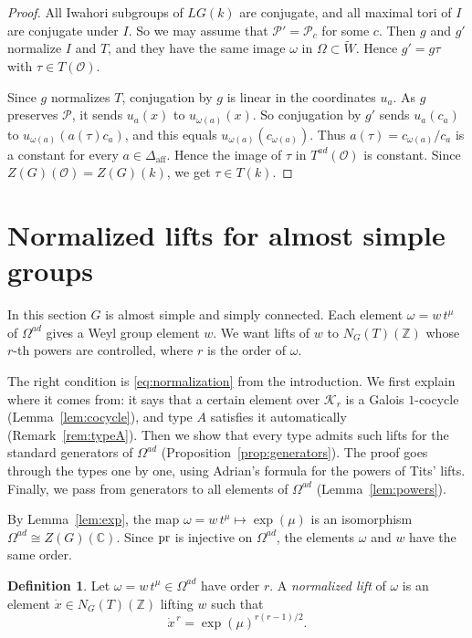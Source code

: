 \documentclass[psamsfonts]{amsart}
\theoremstyle{definition}
\newtheorem{defn}[thm]{Definition}
\theoremstyle{remark}
\numberwithin{equation}{section}
\newcommand{\Z}{\mathbb{Z}}   %
\newcommand{\extw}{\widetilde{W}}
\DeclareMathOperator{\aff}{aff}
\newcommand\cK{\mathcal{K}}
\newcommand\cO{\mathcal{O}}
\newcommand\cP{\mathcal{P}}
\newcommand{\CC}{\mathbb{C}}
\numberwithin{equation}{section}
\newcommand{\om}{\omega}
\newcommand{\Om}{\Omega}
\newcommand\pr{\textup{pr}}
\newcommand{\Daff}{\Delta_{\aff}}
\theoremstyle{plain}
\begin{document}
\begin{proof}
All Iwahori subgroups of $LG(k)$ are conjugate, and all maximal tori of $I$ are conjugate under $I$. So we may assume that $\cP'=\cP_c$ for some $c$. Then $g$ and $g'$ normalize $I$ and $T$, and they have the same image $\om$ in $\Om\subset\extw$. Hence $g'=g\tau$ with $\tau\in T(\cO)$.

Since $g$ normalizes $T$, conjugation by $g$ is linear in the coordinates $u_a$. As $g$ preserves $\cP$, it sends $u_a(x)$ to $u_{\om(a)}(x)$. So conjugation by $g'$ sends $u_a(c_a)$ to $u_{\om(a)}(a(\tau)c_a)$, and this equals $u_{\om(a)}(c_{\om(a)})$. Thus $a(\tau)=c_{\om(a)}/c_a$ is a constant for every $a\in\Daff$. Hence the image of $\tau$ in $T^{ad}(\cO)$ is constant. Since $Z(G)(\cO)=Z(G)(k)$, we get $\tau\in T(k)$.
\end{proof}


\section{Normalized lifts for almost simple groups}\label{sec:normalized}

In this section $G$ is almost simple and simply connected. Each element $\om=w\,t^\mu$ of $\Om^{ad}$ gives a Weyl group element $w$. We want lifts of $w$ to $N_G(T)(\Z)$ whose $r$-th powers are controlled, where $r$ is the order of $\om$.

The right condition is \eqref{eq:normalization} from the introduction. We first explain where it comes from: it says that a certain element over $\cK_r$ is a Galois $1$-cocycle (Lemma~\ref{lem:cocycle}), and type $A$ satisfies it automatically (Remark~\ref{rem:typeA}). Then we show that every type admits such lifts for the standard generators of $\Om^{ad}$ (Proposition~\ref{prop:generators}). The proof goes through the types one by one, using Adrian's formula for the powers of Tits' lifts. Finally, we pass from generators to all elements of $\Om^{ad}$ (Lemma~\ref{lem:powers}).

By Lemma~\ref{lem:exp}, the map $\om=w\,t^{\mu}\mapsto\exp(\mu)$ is an isomorphism $\Om^{ad}\cong Z(G)(\CC)$. Since $\pr$ is injective on $\Om^{ad}$, the elements $\om$ and $w$ have the same order.

\begin{defn}\label{defn:normalized}
Let $\om=w\,t^{\mu}\in\Om^{ad}$ have order $r$. A \emph{normalized lift} of $\om$ is an element $\dot x\in N_G(T)(\Z)$ lifting $w$ such that
\[
\dot x^{\,r}=\exp(\mu)^{r(r-1)/2}.
\]
\end{defn}
\end{document}
